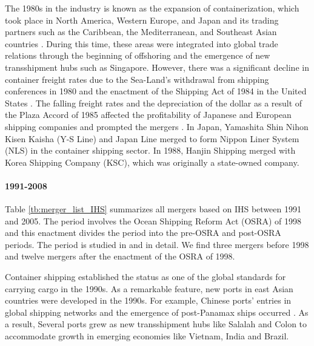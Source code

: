 \documentclass[10pt]{article}
\begin{document}
The 1980s in the industry is known as the expansion of containerization, which took place in North America, Western Europe, and Japan and its trading partners such as the Caribbean, the Mediterranean, and Southeast Asian countries \citep{GUERRERO2014151}. During this time, these areas were integrated into global trade relations through the beginning of offshoring and the emergence of new transshipment hubs such as Singapore. However, there was a significant decline in container freight rates due to the Sea-Land's withdrawal from shipping conferences in 1980 and the enactment of the Shipping Act of 1984 in the United States \citep{matsuda2022unified}. The falling freight rates and the depreciation of the dollar as a result of the Plaza Accord of 1985 affected the profitability of Japanese and European shipping companies and prompted the mergers \citep{Duru2018}. In Japan, Yamashita Shin Nihon Kisen Kaisha (Y-S Line) and Japan Line merged to form Nippon Liner System (NLS) in the container shipping sector. In 1988, Hanjin Shipping merged with Korea Shipping Company (KSC), which was originally a state-owned company. %

\paragraph{1991-2008}

Table \ref{tb:merger_list_IHS} summarizes all mergers based on IHS between 1991 and 2005.
The period involves the Ocean Shipping Reform Act (OSRA) of 1998 and this enactment divides the period into the pre-OSRA and post-OSRA periods. 
The period is studied in \cite{fusillo2006some,fusillo2013stability} and \cite{reitzes2002rolling} in detail.
We find three mergers before 1998 and twelve mergers after the enactment of the OSRA of 1998.

Container shipping established the status as one of the global standards for carrying cargo in the 1990s. 
As a remarkable feature, new ports in east Asian countries were developed in the 1990s.
For example, Chinese ports’ entries in global shipping networks and the emergence of post-Panamax ships occurred \citep{GUERRERO2014151}. As a result, Several ports grew as new transshipment hubs like Salalah and Colon to accommodate growth in emerging economies like Vietnam, India and Brazil.
\end{document}
